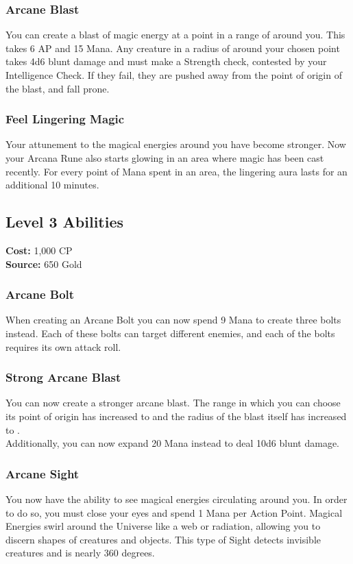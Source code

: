 \subsubsection{Arcane Blast}
You can create a blast of magic energy at a point in a range of  around you.
This takes 6 AP and 15 Mana.
Any creature in a radius of  around your chosen point takes 4d6 blunt damage and must make a Strength check, contested by your Intelligence Check.
If they fail, they are pushed  away from the point of origin of the blast, and fall prone.

\subsubsection{Feel Lingering Magic}
Your attunement to the magical energies around you have become stronger.
Now your Arcana Rune also starts glowing in an area where magic has been cast recently.
For every point of Mana spent in an area, the lingering aura lasts for an additional 10 minutes.

\subsection{Level 3 Abilities}
\textbf{Cost:} 1,000 CP\\
\textbf{Source:} 650 Gold
\subsubsection{Arcane Bolt}
When creating an Arcane Bolt you can now spend 9 Mana to create three bolts instead.
Each of these bolts can target different enemies, and each of the bolts requires its own attack roll.

\subsubsection{Strong Arcane Blast}
You can now create a stronger arcane blast.
The range in which you can choose its point of origin has increased to  and the radius of the blast itself has increased to .\\
Additionally, you can now expand 20 Mana instead to deal 10d6 blunt damage.

\subsubsection{Arcane Sight}
You now have the ability to see magical energies circulating around you.
In order to do so, you must close your eyes and spend 1 Mana per Action Point.
Magical Energies swirl around the Universe like a web or radiation, allowing you to discern shapes of creatures and objects.
This type of Sight detects invisible creatures and is nearly 360 degrees.
\onecolumn